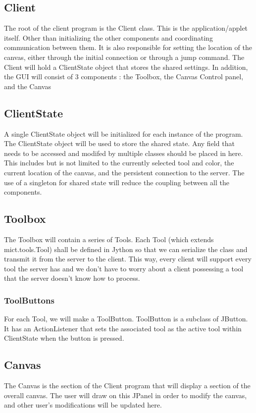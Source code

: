 \documentclass[12pt]{article}
\begin{document}
 \subsection{Client}
    The root of the client program is the Client class. This is the
    application/applet itself. Other than initializing the other components and
    coordinating communication between them. It is also responsible for setting
    the location of the canvas, either through the initial connection or
    through a jump command. The Client will hold a ClientState object that
    stores the shared settings. In addition, the GUI will consist of 3
    components : the Toolbox, the Canvas Control panel, and the Canvas
\subsection{ClientState}
 A single ClientState object will be initialized for each instance of the program. The ClientState object will be used to store the shared state. Any field that needs to be accessed and modifed by multiple classes should be placed in here. This includes but is not limited to the currently selected tool and color, the current location of the canvas, and the persistent connection to the server. The use of a singleton for shared state will reduce the coupling between all the components.
\subsection{Toolbox}
  The Toolbox will contain a series of Tools. Each Tool (which extends mict.tools.Tool) shall be defined in Jython so that we can serialize the class and transmit it from the server to the client. This way, every client will support every tool the server has and we don't have to worry about a client possessing a tool that the server doesn't know how to process.
\subsubsection{ToolButtons}
For each Tool, we will make a ToolButton. ToolButton is a subclass of JButton. It has an ActionListener that sets the associated tool as the active tool within ClientState when the button is pressed.
 \subsection{Canvas}
 The Canvas is the section of the Client program that will display a section of
 the overall canvas. The user will draw on this JPanel in order to modify the
 canvas, and other user's modifications will be updated here.
\end{document}
